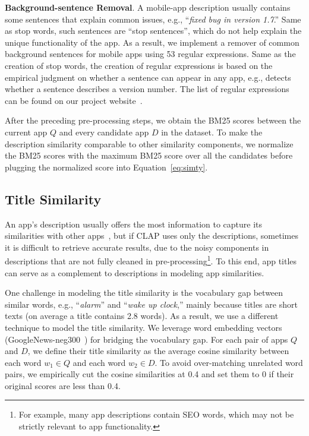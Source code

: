 \textbf{Background-sentence Removal}. A mobile-app description usually contains some sentences that explain common issues, e.g., ``\emph{fixed bug in version 1.7}.'' 
Same as stop words, such sentences are ``stop sentences'', which do not help explain the unique functionality of the app. 
As a result, we implement a remover of common background sentences for mobile apps using 53 regular expressions. 
Same as the creation of stop words, the creation of regular expressions is based on the empirical judgment on whether a sentence can appear in any app, e.g.,  detects whether a sentence describes a version number. 
The list of regular expressions can be found on our project website~\cite{clapproj}.

After the preceding pre-processing steps, we obtain the BM25 scores between the current app $Q$ and every candidate app $D$ in the dataset. 
To make the description similarity comparable to other similarity components, we normalize the BM25 scores with the maximum BM25 score over all the candidates before plugging the normalized score into Equation~\ref{eq:simty}. 

\subsection{Title Similarity}
\label{sec:titlesim}

An app's description usually offers the most information to capture its similarities with other apps~\cite{conf/icse/GorlaTGZ14}, but if CLAP uses only the descriptions, sometimes it is difficult to retrieve accurate results, due to the noisy components in descriptions that are not fully cleaned in pre-processing\footnote{For example, many app descriptions contain SEO words, which may not be strictly relevant to app functionality.}. 
To this end, app titles can serve as a complement to descriptions in modeling app similarities. 

One challenge in modeling the title similarity is the vocabulary gap between similar words, e.g., ``\emph{alarm}'' and ``\emph{wake up clock},'' mainly because titles are short texts (on average a title contains 2.8 words). 
As a result, we use a different technique to model the title similarity. 
We leverage word embedding vectors~\cite{conf/nips/MikolovSCCD13} (GoogleNews-neg300~\cite{word2vec}) for bridging the vocabulary gap. 
For each pair of apps $Q$ and $D$, we define their title similarity as the average cosine similarity between each word $w_1\in Q$ and each word $w_2\in D$. 
To avoid over-matching unrelated word pairs, we empirically cut the cosine similarities at 0.4 and set them to 0 if their original scores are less than 0.4. 

